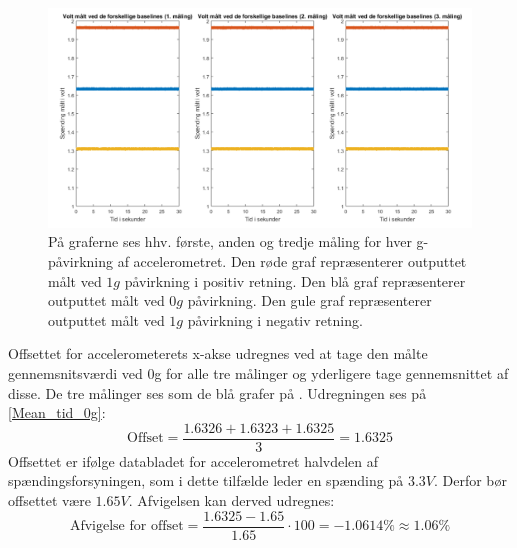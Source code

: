 \begin{figure}[H]
	\centering
	\includegraphics[scale=0.45]{figures/cProblemloesning/Pilotforsoeg_Tid.png}
	\caption{På graferne ses hhv. første, anden og tredje måling for hver g-påvirkning af accelerometret. Den røde graf repræsenterer outputtet målt ved $1g$ påvirkning i positiv retning. Den blå graf repræsenterer outputtet målt ved $0g$ påvirkning. Den gule graf repræsenterer outputtet målt ved $1g$ påvirkning i negativ retning.}
	\label{Fig:Pilot_Tid}
\end{figure}
\noindent Offsettet for accelerometerets x-akse udregnes ved at tage den målte gennemsnitsværdi ved $0$g for alle tre målinger og yderligere tage gennemsnittet af disse. De tre målinger ses som de blå grafer på . Udregningen ses på \ref{Mean_tid_0g}:
\begin{equation}\label{Mean_tid_0g}
\text{Offset} = \frac{1.6326 + 1.6323 + 1.6325}{3} = 1.6325
\end{equation}
\noindent Offsettet er ifølge databladet for accelerometret halvdelen af spændingsforsyningen, som i dette tilfælde leder en spænding på $3.3V$. \cite{Devices2009} Derfor bør offsettet være $1.65V$. Afvigelsen kan derved udregnes:
\begin{equation}
\text{Afvigelse for offset} = \dfrac{1.6325 - 1.65}{1.65} \cdot 100 = -1.0614\% \approx 1.06\%
\end{equation}


